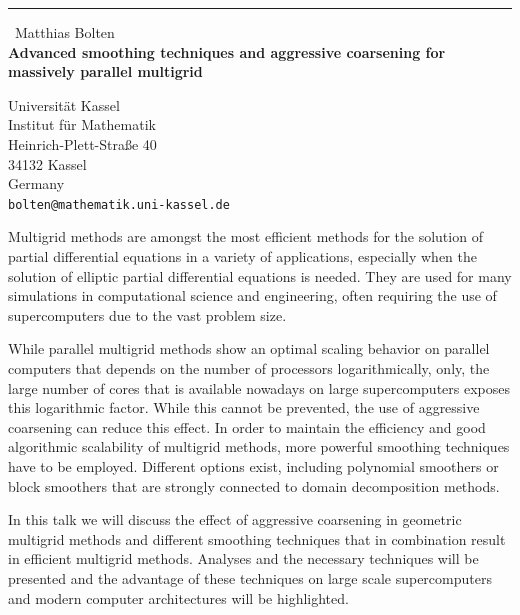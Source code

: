 \documentclass{report}
\begin{document}
\begin{center}
\rule{6in}{1pt} \
{\large Matthias Bolten \\
{\bf Advanced smoothing techniques and aggressive coarsening for massively parallel multigrid}}

Universit\"at Kassel \\ Institut f\"ur Mathematik \\ Heinrich-Plett-Stra\ss{}e 40 \\ 34132 Kassel \\ Germany
\\
{\tt bolten@mathematik.uni-kassel.de}\end{center}

Multigrid methods are amongst the most efficient methods for the solution
of partial differential equations in a variety of applications,
especially when the solution of elliptic partial differential equations
is needed. They are used for many simulations in computational science
and engineering, often requiring the use of supercomputers due to the
vast problem size.

While parallel multigrid methods show an optimal scaling behavior on
parallel computers that depends on the number of processors
logarithmically, only, the large number of cores that is available
nowadays on large supercomputers exposes this logarithmic factor. While
this cannot be prevented, the use of aggressive coarsening can reduce
this effect. In order to maintain the efficiency and good algorithmic
scalability of multigrid methods, more powerful smoothing techniques have
to be employed. Different options exist, including polynomial smoothers
or block smoothers that are strongly connected to domain decomposition
methods.

In this talk we will discuss the effect of aggressive coarsening in
geometric multigrid methods and different smoothing techniques that in
combination result in efficient multigrid methods. Analyses and the
necessary techniques will be presented and the advantage of these
techniques on large scale supercomputers and modern computer
architectures will be highlighted.
\end{document}
